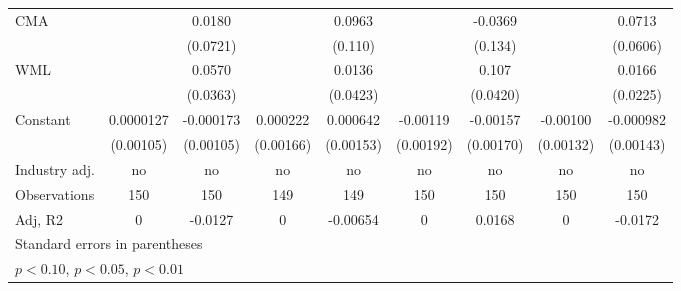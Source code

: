 {\begin{tabular}{l*{8}{c}}
CMA                 &                     &      0.0180         &                     &      0.0963         &                     &     -0.0369         &                     &      0.0713         \\
                    &                     &    (0.0721)         &                     &     (0.110)         &                     &     (0.134)         &                     &    (0.0606)         \\
WML                 &                     &      0.0570         &                     &      0.0136         &                     &       0.107\sym{**} &                     &      0.0166         \\
                    &                     &    (0.0363)         &                     &    (0.0423)         &                     &    (0.0420)         &                     &    (0.0225)         \\
Constant            &   0.0000127         &   -0.000173         &    0.000222         &    0.000642         &    -0.00119         &    -0.00157         &    -0.00100         &   -0.000982         \\
                    &   (0.00105)         &   (0.00105)         &   (0.00166)         &   (0.00153)         &   (0.00192)         &   (0.00170)         &   (0.00132)         &   (0.00143)         \\
\hline
Industry adj.       &          no         &          no         &          no         &          no         &          no         &          no         &          no         &          no         \\
Observations        &         150         &         150         &         149         &         149         &         150         &         150         &         150         &         150         \\
Adj, R2             &           0         &     -0.0127         &           0         &    -0.00654         &           0         &      0.0168         &           0         &     -0.0172         \\
\hline\hline
\multicolumn{9}{l}{\footnotesize Standard errors in parentheses}\\
\multicolumn{9}{l}{\footnotesize \sym{*} \(p<0.10\), \sym{**} \(p<0.05\), \sym{***} \(p<0.01\)}\\
\end{tabular}
}
